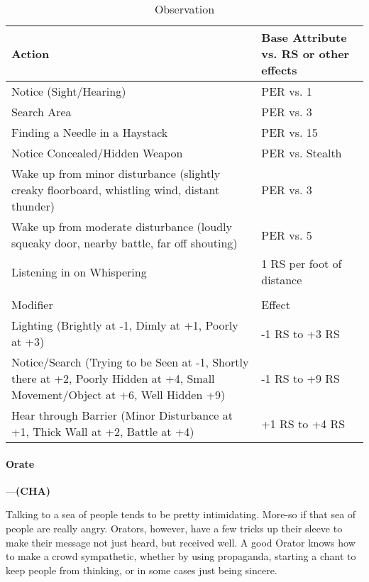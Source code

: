 \documentclass[oneside,11pt,english]{book}
\begin{document}
\begin{longtabu} to \linewidth{X[1.5]X[r]}
	\caption{Observation}
	\label{tab:Observation}\\
	\rowfont[c]{}Action &Base Attribute vs. RS or other effects\\\toprule
Notice (Sight/Hearing) &PER vs. 1\\
Search Area &PER vs. 3 \\
Finding a Needle in a Haystack &PER vs. 15 \\
Notice Concealed/Hidden Weapon &PER vs. Stealth \\
Wake up from minor disturbance (slightly creaky floorboard, whistling wind, distant thunder) &PER vs. 3 \\
Wake up from moderate disturbance (loudly squeaky door, nearby battle, far off shouting) &PER vs. 5 \\
Listening in on Whispering &1 RS per foot of distance\\
	\\
		\rowfont[c]{} Modifier & Effect\\\cmidrule(lr){1-2}
Lighting (Brightly at -1, Dimly at +1, Poorly at +3) &-1 RS to +3 RS \\
Notice/Search (Trying to be Seen at -1, Shortly there at +2, Poorly Hidden at +4, Small Movement/Object at +6, Well Hidden +9) &-1 RS to +9 RS \\
Hear through Barrier (Minor Disturbance at +1, Thick Wall at +2, Battle at +4) &+1 RS to +4 RS \\
\end{longtabu}

\paragraph{\label{skill:Orate}Orate}---\quad\textbf{(CHA)}\par
Talking to a sea of people tends to be pretty intimidating. More-so if that sea of people are really angry. Orators, however, have a few tricks up their sleeve to make their message not just heard, but received well. A good Orator knows how to make a crowd sympathetic, whether by using propaganda, starting a chant to keep people from thinking, or in some cases just being sincere.
\end{document}
